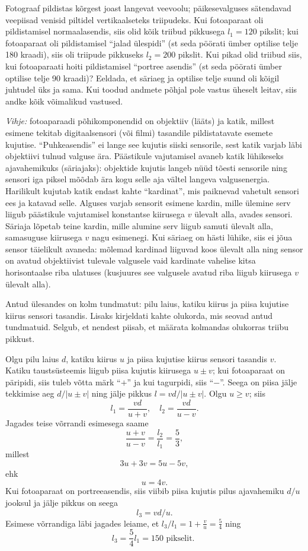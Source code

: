 
Fotograaf pildistas kõrgest joast langevat veevoolu; päikesevalguses sätendavad veepiisad venisid piltidel vertikaalseteks triipudeks.
Kui fotoaparaat oli pildistamisel normaalasendis, siis olid kõik triibud pikkusega $l_1 = \num{120}$ pikslit; kui fotoaparaat oli pildistamisel \enquote{jalad ülespidi} (st seda
pöörati ümber optilise telje \num{180} kraadi), siis oli triipude pikkuseks $l_2 = \num{200}$
pikslit. Kui pikad olid triibud siis, kui fotoaparaati hoiti pildistamisel \enquote{portree
asendis} (st seda pöörati ümber optilise telje \num{90} kraadi)? Eeldada, et säriaeg
ja optilise telje suund oli kõigil juhtudel üks ja sama. Kui toodud andmete
põhjal pole vastus üheselt leitav, siis andke kõik võimalikud vastused.

\emph{Vihje:} 
fotoaparaadi põhikomponendid on objektiiv (lääts) ja katik, millest
esimene tekitab digitaalsensori (või filmi) tasandile pildistatavate esemete kujutise. \enquote{Puhkeasendis} ei lange see kujutis siiski sensorile, sest katik varjab
läbi objektiivi tulnud valguse ära. Päästikule vajutamisel avaneb katik lühikeseks ajavahemikuks (säriajaks): objektide kujutis langeb nüüd tõesti sensorile
ning sensori iga piksel mõõdab ära kogu selle aja vältel langeva valgusenergia.
Harilikult kujutab katik endast kahte \enquote{kardinat}, mis paiknevad vahetult sensori ees ja katavad selle. Alguses varjab sensorit esimene kardin, mille ülemine
serv liigub päästikule vajutamisel konstantse kiirusega $v$ ülevalt alla, avades
sensori. Säriaja lõpetab teine kardin, mille alumine serv liigub samuti ülevalt
alla, samasuguse kiirusega $v$ nagu esimenegi. Kui säriaeg on hästi lühike, siis
ei jõua sensor täielikult avaneda: mõlemad kardinad liiguvad koos ülevalt alla
ning sensor on avatud objektiivist tulevale valgusele vaid kardinate vahelise
kitsa horisontaalse riba ulatuses (kusjuures see valgusele avatud riba liigub
kiirusega $v$ ülevalt alla).

\hint
Antud ülesandes on kolm tundmatut: pilu laius, katiku kiirus ja piisa kujutise kiirus sensori tasandis. Lisaks kirjeldati kahte olukorda, mis seovad antud tundmatuid. Selgub, et nendest piisab, et määrata kolmandas olukorras triibu pikkust.

\solu
Olgu pilu laius $d$, katiku kiirus $u$ ja piisa kujutise kiirus sensori tasandis $v$. Katiku
taustsüsteemis liigub piisa kujutis kiirusega $u \pm v$; kui fotoaparaat on päripidi, siis tuleb võtta märk \enquote{$+$} ja kui tagurpidi, siis \enquote{$-$}. Seega on piisa jälje tekkimise aeg
$d/|u \pm v|$ ning jälje pikkus $l = vd/|u \pm v|$. Olgu $u \geq v$; siis
\[
l_{1}=\frac{v d}{u+v}, \quad l_{2}=\frac{v d}{u-v}.
\]
Jagades teise võrrandi esimesega saame 
\[
\frac{u+v}{u-v}=\frac{l_{2}}{l_{1}}=\frac{5}{3},
\]
millest
\[
3u+ 3v = 5u-5v,
\]
ehk
\[
u = 4v.
\]
Kui fotoaparaat on portreeasendis, siis viibib piisa kujutis pilus ajavahemiku
$d/u$ jooksul ja jälje pikkus on seega
\[
l_3 = vd/u.
\]
Esimese võrrandiga läbi jagades leiame, et $l_3/l_1 = 1 + \frac{v}{u} = \frac{5}{4}$
ning
\[
l_{3}=\frac{5}{4} l_{1}=150 \text { pikselit. }
\]

